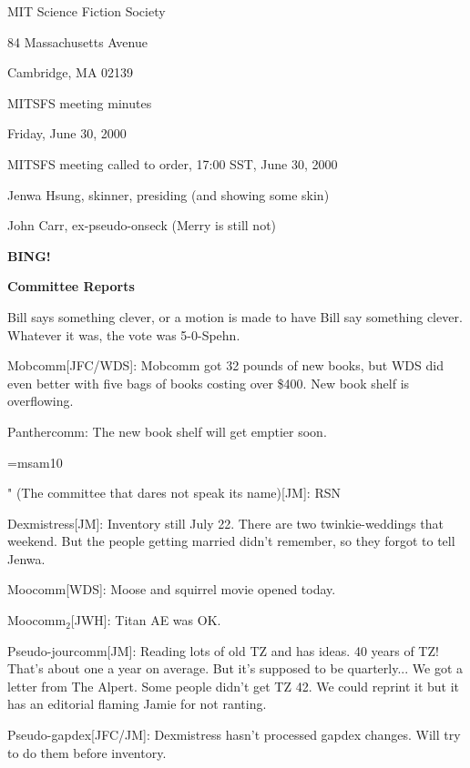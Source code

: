 \documentclass[12pt]{article}
\begin{document}
\begin{center}

MIT Science Fiction Society 

84 Massachusetts Avenue

Cambridge, MA 02139

\vspace{12pt}

MITSFS meeting minutes

Friday, June 30, 2000

\end{center}

\vskip 12pt

MITSFS meeting called to order, 17:00 SST, June 30, 2000

Jenwa Hsung, skinner, presiding (and showing some skin)

John Carr, ex-pseudo-onseck (Merry is still not)

{\bf BING!}

\vskip 12pt

\centerline{{\bf Committee Reports}}

\vskip 12pt

Bill says something clever, or a motion is made to have Bill say
something clever.  Whatever it was, the vote was \hbox{5-0-Spehn}.

Mobcomm[JFC/WDS]: Mobcomm got 32 pounds of new books, but WDS did even
better with five bags of books costing over \$400.  New book shelf is
overflowing.

Panthercomm: The new book shelf will get emptier soon.

\font\sym=msam10

{\sym "} (The committee that dares not speak its name)[JM]: RSN

Dexmistress[JM]: Inventory still July 22.  There are two twinkie-weddings
that weekend.  But the people getting married didn't remember, so they forgot
to tell Jenwa.

Moocomm[WDS]: Moose and squirrel movie opened today.

Moocomm$_2$[JWH]: Titan AE was OK.

Pseudo-jourcomm[JM]: Reading lots of old TZ and has ideas.  40 years of TZ!
That's about one a year on average. But it's supposed to be quarterly...
We got a letter from The Alpert.  Some people didn't get TZ 42.
We could reprint it but it has an editorial flaming Jamie for not ranting.

Pseudo-gapdex[JFC/JM]: Dexmistress hasn't processed gapdex changes.  Will
try to do them before inventory.
\end{document}
